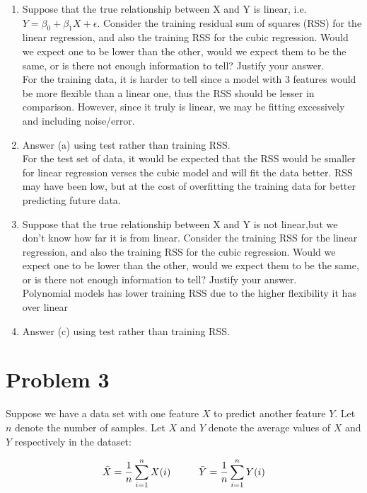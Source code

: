 \documentclass[12pt]{article}
\newcommand\tab[1][1cm]{\hspace*{#1}}
\begin{document}
\begin{enumerate}
    \item Suppose that the true relationship between X and Y is linear, i.e. $Y = \beta_0 + \beta_1X + \epsilon$.  Consider the training residual sum of squares (RSS) for the linear regression, and also the training RSS for the cubic regression. Would we expect one to be lower than the other, would we expect them to be the same, or is there not enough information to tell? Justify your answer.\\ For the training data, it is harder to tell since a model with 3 features would be more flexible than a linear one, thus the RSS should be lesser in comparison. However, since it truly is linear, we may be fitting excessively and including noise/error.
    \item Answer (a) using test rather than training RSS.\\ For the test set of data, it would be expected that the RSS would be smaller for linear regression verses the cubic model and will fit the data better. RSS may have been low, but at the cost of overfitting the training data for better predicting future data.
    \item Suppose that the true relationship between X and Y is not linear,but we don't know how far it is from linear. Consider the training RSS for the linear regression, and also the training RSS for the cubic regression. Would we expect one to be lower than the other, would we expect them to be the same, or is there not enough information to tell? Justify your answer.\\ Polynomial models has lower training RSS due to the higher flexibility it has over linear
    \item Answer (c) using test rather than training RSS.
\end{enumerate}

\pagebreak
\section*{Problem 3}
Suppose we have a data set with one feature $X$ to predict another feature $Y$. Let $n$ denote the number of samples. Let $X$ and $Y$ denote the average values of $X$ and $Y$ respectively in the dataset:

\begin{center}
    \[
        \bar{X} = \frac{1}{n}\sum_{i = 1}^{n}X(i)
        \tab
        \bar{Y} = \frac{1}{n}\sum_{i = 1}^{n}Y(i)
    \]
\end{center}
\end{document}
